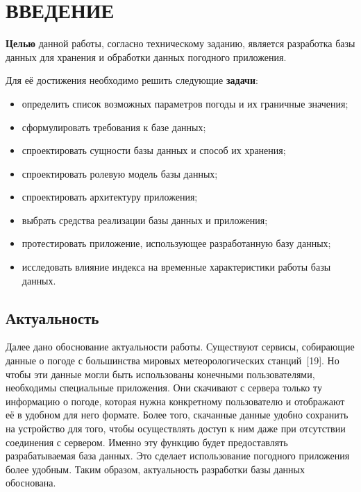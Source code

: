 \chapter*{ВВЕДЕНИЕ}

\textbf{Целью} данной работы, согласно техническому заданию, является разработка базы данных для хранения и обработки данных погодного приложения.

Для её достижения необходимо решить следующие \textbf{задачи}:
\begin{itemize}
    \item определить список возможных параметров погоды и их граничные значения;
    \item сформулировать требования к базе данных;
    \item спроектировать сущности базы данных и способ их хранения;
    \item спроектировать ролевую модель базы данных;
    \item спроектировать архитектуру приложения;
    \item выбрать средства реализации базы данных и приложения;
    \item протестировать приложение, использующее разработанную базу данных;
    \item исследовать влияние индекса на временные характеристики работы базы данных.
\end{itemize}

\section*{Актуальность}
Далее дано обоснование актуальности работы.
Существуют сервисы, собирающие данные о погоде с большинства мировых метеорологических станций~[19].
Но чтобы эти данные могли быть использованы конечными пользователями, необходимы специальные приложения.
Они скачивают с сервера только ту информацию о погоде, которая нужна конкретному пользователю и отображают её в удобном для него формате.
Более того, скачанные данные удобно сохранить на устройство для того, чтобы осуществлять доступ к ним даже при отсутствии соединения с сервером.
Именно эту функцию будет предоставлять разрабатываемая база данных.
Это сделает использование погодного приложения более удобным.
Таким образом, актуальность разработки базы данных обоснована.
